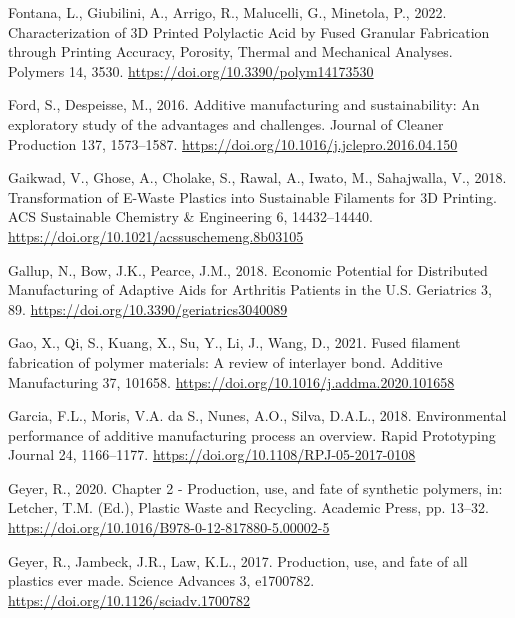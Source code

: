 \documentclass[
  12pt,
  number,
  review]{elsarticle}
\newlength{\cslhangindent}
\newlength{\cslentryspacingunit} %
\newenvironment{CSLReferences}[2] %
 {%
  \setlength{\parindent}{0pt}
  \ifodd #1
  \let\oldpar\par
  \def\par{\hangindent=\cslhangindent\oldpar}
  \fi
  \setlength{\parskip}{#2\cslentryspacingunit}
 }%
 {}
\begin{document}
\begin{CSLReferences}{1}{0}
\leavevmode{}%
Fontana, L., Giubilini, A., Arrigo, R., Malucelli, G., Minetola, P.,
2022. Characterization of {3D Printed Polylactic Acid} by {Fused
Granular Fabrication} through {Printing Accuracy}, {Porosity}, {Thermal}
and {Mechanical Analyses}. Polymers 14, 3530.
\url{https://doi.org/10.3390/polym14173530}

\leavevmode{}%
Ford, S., Despeisse, M., 2016. Additive manufacturing and
sustainability: An exploratory study of the advantages and challenges.
Journal of Cleaner Production 137, 1573--1587.
\url{https://doi.org/10.1016/j.jclepro.2016.04.150}

\leavevmode{}%
Gaikwad, V., Ghose, A., Cholake, S., Rawal, A., Iwato, M., Sahajwalla,
V., 2018. Transformation of {E-Waste Plastics} into {Sustainable
Filaments} for {3D Printing}. ACS Sustainable Chemistry \& Engineering
6, 14432--14440. \url{https://doi.org/10.1021/acssuschemeng.8b03105}

\leavevmode{}%
Gallup, N., Bow, J.K., Pearce, J.M., 2018. Economic {Potential} for
{Distributed Manufacturing} of {Adaptive Aids} for {Arthritis Patients}
in the {U}.{S}. Geriatrics 3, 89.
\url{https://doi.org/10.3390/geriatrics3040089}

\leavevmode{}%
Gao, X., Qi, S., Kuang, X., Su, Y., Li, J., Wang, D., 2021. Fused
filament fabrication of polymer materials: {A} review of interlayer
bond. Additive Manufacturing 37, 101658.
\url{https://doi.org/10.1016/j.addma.2020.101658}

\leavevmode{}%
Garcia, F.L., Moris, V.A. da S., Nunes, A.O., Silva, D.A.L., 2018.
Environmental performance of additive manufacturing process
\textendash{} an overview. Rapid Prototyping Journal 24, 1166--1177.
\url{https://doi.org/10.1108/RPJ-05-2017-0108}

\leavevmode{}%
Geyer, R., 2020. Chapter 2 - {Production}, use, and fate of synthetic
polymers, in: Letcher, T.M. (Ed.), Plastic {Waste} and {Recycling}.
{Academic Press}, pp. 13--32.
\url{https://doi.org/10.1016/B978-0-12-817880-5.00002-5}

\leavevmode{}%
Geyer, R., Jambeck, J.R., Law, K.L., 2017. Production, use, and fate of
all plastics ever made. Science Advances 3, e1700782.
\url{https://doi.org/10.1126/sciadv.1700782}


\end{CSLReferences}
\end{document}
